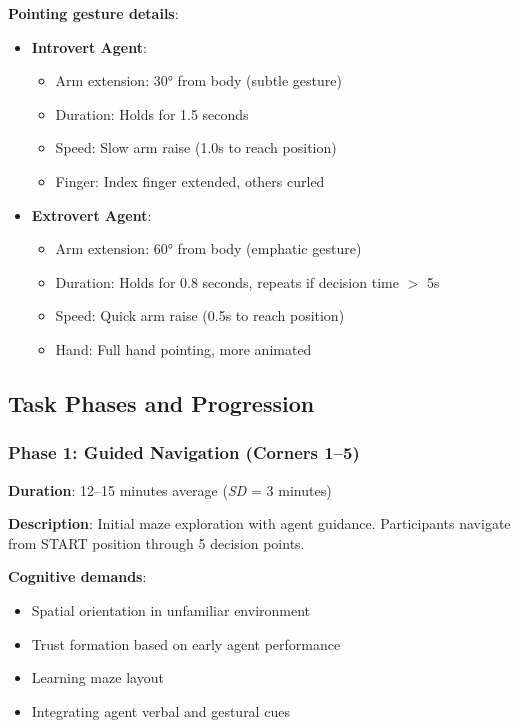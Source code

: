 \documentclass[12pt]{article}
\begin{document}
\textbf{Pointing gesture details}:
\begin{itemize}
    \item \textbf{Introvert Agent}: 
    \begin{itemize}
        \item Arm extension: 30° from body (subtle gesture)
        \item Duration: Holds for 1.5 seconds
        \item Speed: Slow arm raise (1.0s to reach position)
        \item Finger: Index finger extended, others curled
    \end{itemize}
    
    \item \textbf{Extrovert Agent}:
    \begin{itemize}
        \item Arm extension: 60° from body (emphatic gesture)
        \item Duration: Holds for 0.8 seconds, repeats if decision time $>$ 5s
        \item Speed: Quick arm raise (0.5s to reach position)
        \item Hand: Full hand pointing, more animated
    \end{itemize}
\end{itemize}

\subsection{Task Phases and Progression}

\subsubsection{Phase 1: Guided Navigation (Corners 1--5)}

\textbf{Duration}: 12--15 minutes average (\textit{SD} = 3 minutes)

\textbf{Description}: Initial maze exploration with agent guidance. Participants navigate from START position through 5 decision points.

\textbf{Cognitive demands}:
\begin{itemize}
    \item Spatial orientation in unfamiliar environment
    \item Trust formation based on early agent performance
    \item Learning maze layout
    \item Integrating agent verbal and gestural cues
\end{itemize}
\end{document}
